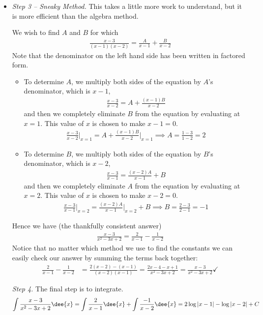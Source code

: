 \begin{eg}
\begin{itemize}
\item \emph{Step 3 -- Sneaky Method.} This takes a little more work to understand,
but it is more efficient than the algebra method.

We wish to find $A$ and $B$ for which
\begin{align*}
\frac{x-3}{(x-1)(x-2)}
=\frac{A}{x-1}+\frac{B}{x-2}
\end{align*}
Note that the denominator on the left hand side has been written in factored form.
\begin{itemize}
\item To determine $A$, we multiply both sides of the equation
by $A$'s denominator, which is $x-1$,
\begin{align*}
\frac{x-3}{x-2}
=A+\frac{(x-1)B}{x-2}
\end{align*}
and then we completely eliminate $B$ from the equation by evaluating
at $x=1$. This value of $x$ is chosen to make $x-1=0$.
\begin{align*}
\frac{x-3}{x-2}\bigg|_{x=1}
=A+\frac{(x-1)B}{x-2}\bigg|_{x=1}
\implies A = \frac{1-3}{1-2} = 2
\end{align*}

\item To determine $B$, we multiply both sides of the equation
by $B$'s denominator, which is $x-2$,
\begin{align*}
\frac{x-3}{x-1}
=\frac{(x-2)A}{x-1} + B
\end{align*}
and then we completely eliminate $A$ from the equation by evaluating
at $x=2$. This value of $x$ is chosen to make $x-2=0$.
\begin{align*}
\frac{x-3}{x-1}\bigg|_{x=2}
=\frac{(x-2)A}{x-1}\bigg|_{x=2} +B
\implies B = \frac{2-3}{2-1} = -1
\end{align*}
\end{itemize}
Hence we have (the thankfully consistent answer)
\begin{align*}
  \frac{x-3}{x^2-3x+2}
=\frac{2}{x-1}-\frac{1}{x-2}
\end{align*}
Notice that no matter which method we use to find the constants we can easily check our
answer by summing the terms back together:
\begin{align*}
  \frac{2}{x-1}-\frac{1}{x-2}
&= \frac{2(x-2)-(x-1)}{(x-2)(x-1)}
= \frac{2x-4-x+1}{x^2-3x+2}
= \frac{x-3}{x^2-3x+2} \checkmark
\end{align*}


\medskip
\noindent\emph{Step 4.}
 The final step is to integrate.
\begin{align*}
\int\frac{x-3}{x^2-3x+2}\dee{x}
=\int \frac{2}{x-1}\dee{x} +\int \frac{-1}{x-2}\dee{x}
=2\log|x-1|-\log|x-2|+C
\end{align*}
\end{itemize}
\end{eg}

